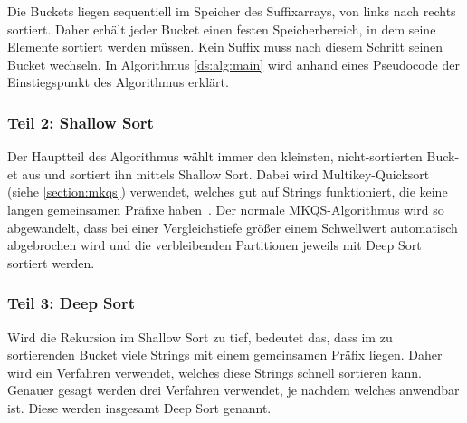 Die Buckets liegen sequentiell im Speicher des Suffixarrays, von links nach rechts sortiert.
Daher erhält jeder Bucket einen festen Speicherbereich, in dem seine Elemente sortiert werden müssen.
Kein Suffix muss nach diesem Schritt seinen Bucket wechseln.
In Algorithmus \ref{ds:alg:main} wird anhand eines Pseudocode der Einstiegspunkt des Algorithmus erklärt.

\subsubsection{Teil 2: Shallow Sort}

Der Hauptteil des Algorithmus wählt immer den kleinsten,
nicht-sortierten Buck-et aus und sortiert ihn mittels Shallow Sort.
Dabei wird Multikey-Quicksort (siehe \cref{section:mkqs}) verwendet,
welches gut auf Strings funktioniert, die keine langen gemeinsamen Präfixe haben~\cite{saca:4}.
Der normale MKQS-Algorithmus wird so abgewandelt,
dass bei einer Vergleichstiefe größer einem Schwellwert automatisch abgebrochen wird
und die verbleibenden Partitionen jeweils mit Deep Sort sortiert werden.

\subsubsection{Teil 3: Deep Sort}

Wird die Rekursion im Shallow Sort zu tief, bedeutet das,
dass im zu sortierenden Bucket viele Strings mit einem gemeinsamen Präfix liegen.
Daher wird ein Verfahren verwendet, welches diese Strings schnell sortieren kann.
Genauer gesagt werden drei Verfahren verwendet, je nachdem welches anwendbar ist.
Diese werden insgesamt Deep Sort genannt.

